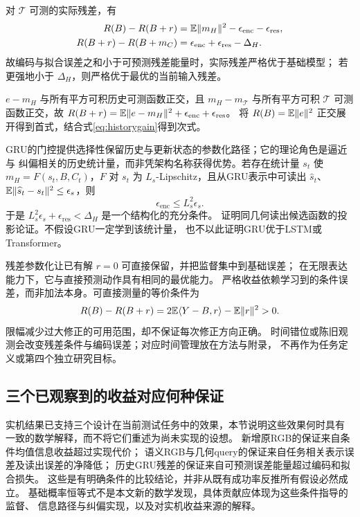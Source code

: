 \begin{proposition}[实际GRU残差的条件性保证]
\label{prop:gru}
对 $\mathcal T$ 可测的实际残差，有
\begin{align}
 R(B)-R(B+r)
 &=\mathbb E\lVert m_H\rVert^2-\epsilon_{\mathrm{enc}}-\epsilon_{\mathrm{res}},
 \label{eq:unified}\\
 R(B+r)-R(B+m_C)
 &=\epsilon_{\mathrm{enc}}+\epsilon_{\mathrm{res}}-\Delta_H.
 \label{eq:grucompare}
\end{align}
故编码与拟合误差之和小于可预测残差能量时，实际残差严格优于基础模型；
若更强地小于 $\Delta_H$，则严格优于最优的当前输入残差。
\end{proposition}
\begin{IEEEproof}
$e-m_H$ 与所有平方可积历史可测函数正交，且
$m_H-m_\mathcal T$ 与所有平方可积 $\mathcal T$ 可测函数正交，故
$R(B+r)=\mathbb E\lVert e-m_H\rVert^2+\epsilon_{\mathrm{enc}}+\epsilon_{\mathrm{res}}$。
将 $R(B)=\mathbb E\lVert e\rVert^2$ 正交展开得到首式，结合式\eqref{eq:historygain}得到次式。
\end{IEEEproof}

GRU的门控提供选择性保留历史与更新状态的参数化路径；它的理论角色是逼近与
纠偏相关的历史统计量，而非凭架构名称获得优势。若存在统计量 $s_t$ 使
$m_H=F(s_t,B,C_t)$，$F$ 对 $s_t$ 为 $L_s$-Lipschitz，且从GRU表示中可读出
$\widehat s_t$、$\mathbb E\lVert\widehat s_t-s_t\rVert^2\leq\epsilon_s$，则
\begin{equation}
 \epsilon_{\mathrm{enc}}\leq L_s^2\epsilon_s.
 \label{eq:grustat}
\end{equation}
于是 $L_s^2\epsilon_s+\epsilon_{\mathrm{res}}<\Delta_H$ 是一个结构化的充分条件。
证明同几何读出候选函数的投影论证。不假设GRU一定学到该统计量，
也不以此证明GRU优于LSTM或Transformer。

残差参数化让已有解 $r=0$ 可直接保留，并把监督集中到基础误差；
在无限表达能力下，它与直接预测动作具有相同的最优能力。
严格收益依赖学习到的条件误差，而非加法本身。可直接测量的等价条件为
\begin{equation}
 R(B)-R(B+r)=2\mathbb E\langle Y-B,r\rangle-\mathbb E\lVert r\rVert^2>0.
 \label{eq:alignment}
\end{equation}
限幅减少过大修正的可用范围，却不保证每次修正方向正确。
时间错位或陈旧观测会改变残差条件与编码误差；对应时间管理放在方法与附录，
不再作为任务定义或第四个独立研究目标。

\subsection{三个已观察到的收益对应何种保证}
实机结果已支持三个设计在当前测试任务中的效果，本节说明这些效果何时具有
一致的数学解释，而不将它们重述为尚未实现的设想。
新增原RGB的保证来自条件均值信息收益超过实现代价；
语义RGB与几何query的保证来自任务相关表示误差及读出误差的净降低；
历史GRU残差的保证来自可预测误差能量超过编码和拟合损失。
这些是有明确条件的比较结论，并非从既有成功率反推所有假设必然成立。
基础概率恒等式不是本文新的数学发现，具体贡献应体现为这些条件指导的监督、
信息路径与纠偏实现，以及对实机收益来源的解释。
